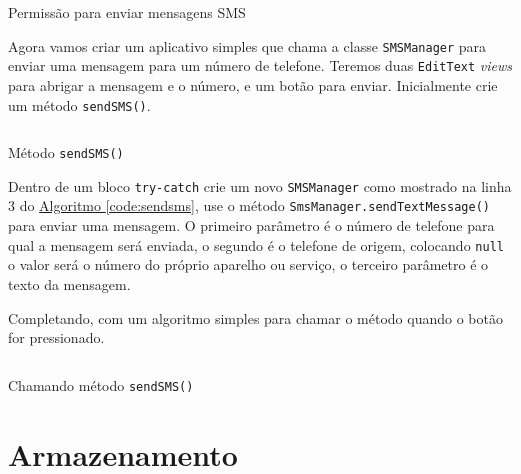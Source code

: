 \documentclass[a4paper,12pt,brazil,oneside]{book}
\begin{document}
\begin{singlespace}
		\begin{listing}[H]
		\inputminted[linenos=true,fontsize=\small,frame=lines, framesep=2mm, tabsize=2,numbersep=5pt]{xml}{src/api/comm/sms-perm.xml}
		\caption{Permissão para enviar mensagens SMS}
		\label{code:sms-perm}
		\end{listing} 	

		Agora vamos criar um aplicativo simples que chama a classe \texttt{SMSManager} para enviar uma mensagem para um número de telefone. Teremos duas \texttt{EditText} \emph{views} para abrigar a mensagem e o número, e um botão para enviar. Inicialmente crie um método \texttt{sendSMS()}.

		\begin{listing}[H]
		\inputminted[linenos=true,fontsize=\small,frame=lines, framesep=2mm, tabsize=2,numbersep=5pt]{java}{src/api/comm/sendsms.java}
		\caption{Método \texttt{sendSMS()}}
		\label{code:sendsms}
		\end{listing} 	
	
		Dentro de um bloco \texttt{try-catch} crie um novo \texttt{SMSManager} como mostrado na linha 3 do  \hyperref[code:sendsms]{Algoritmo \ref*{code:sendsms}}, use o método \texttt{SmsManager.sendTextMessage()} para enviar uma mensagem. O primeiro parâmetro é o número de telefone para qual a mensagem será enviada, o segundo é o telefone de origem, colocando \texttt{null} o valor será o número do próprio aparelho ou serviço, o terceiro parâmetro é o texto da mensagem.
		
		Completando, com um algoritmo simples para chamar o método quando o botão for pressionado.

		\begin{listing}[H]
		\inputminted[linenos=true,fontsize=\small,frame=lines, framesep=2mm, tabsize=2,numbersep=5pt]{java}{src/api/comm/sendsms-oncreate.java}
		\caption{Chamando método \texttt{sendSMS()}}
		\label{code:sendsms2}
		\end{listing} 	

\chapter{Armazenamento}


\end{singlespace}
\end{document}
